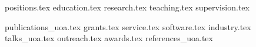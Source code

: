 \documentclass[a4paper,11pt]{article}
\begin{document}

{positions.tex}
{education.tex}
{research.tex}
{teaching.tex}
{supervision.tex}

{publications_uoa.tex}
{grants.tex}
\pagebreak
{service.tex}
{software.tex}
{industry.tex}
{talks_uoa.tex}
{outreach.tex}
{awards.tex}
{references_uoa.tex}
\end{document}
